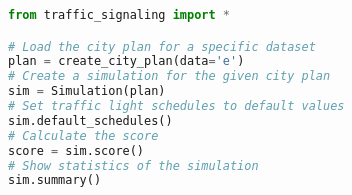 \begin{lstlisting}[language=Python]
from traffic_signaling import *

# Load the city plan for a specific dataset
plan = create_city_plan(data='e')
# Create a simulation for the given city plan
sim = Simulation(plan)
# Set traffic light schedules to default values
sim.default_schedules()
# Calculate the score
score = sim.score()
# Show statistics of the simulation
sim.summary()
\end{lstlisting}
